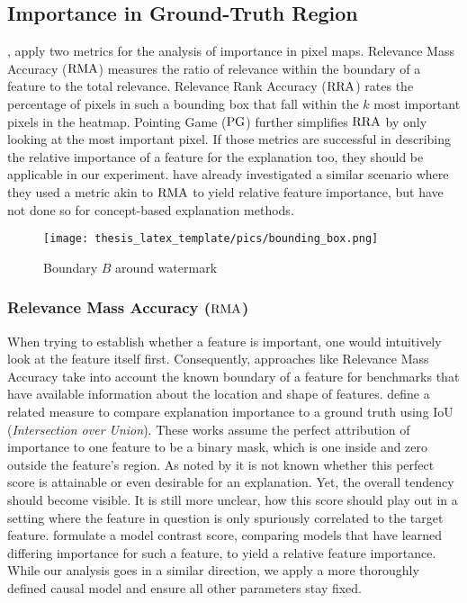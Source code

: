 \subsection{Importance in Ground-Truth Region}\label{section:region_specific}
\citet{Arras2022}, apply two metrics for the analysis of importance in pixel maps. Relevance Mass Accuracy ($\operatorname*{RMA}$) measures the ratio of relevance within the boundary of a feature to the total relevance. Relevance Rank Accuracy ($\operatorname*{RRA}$) rates the percentage of pixels in such a bounding box that fall within the $k$ most important pixels in the heatmap.  Pointing Game ($\operatorname*{PG}$) further simplifies $\operatorname*{RRA}$ by only looking at the most important pixel. If those metrics are successful in describing the relative importance of a feature for the explanation too, they should be applicable in our experiment. \cite{Yang2019} have already investigated a similar scenario where they used a metric akin to $\operatorname*{RMA}$ to yield relative feature importance, but have not done so for concept-based explanation methods.
\begin{figure}[t!]
    \centering
        \texttt{[image: thesis\_latex\_template/pics/bounding\_box.png]}
\caption{Boundary $B$ around watermark}
\label{fig:bounding_box}
\end{figure}

\subsubsection{Relevance Mass Accuracy ($\operatorname*{RMA}$)}
When trying to establish whether a feature is important, one would intuitively look at the feature itself first. Consequently, approaches like Relevance Mass Accuracy take into account the known boundary of a feature for benchmarks that have available information about the location and shape of features.
\citet{Bau2017} define a related measure to compare explanation importance to a ground truth using IoU (\textit{Intersection over Union}). These works assume the perfect attribution of importance to one feature to be a binary mask, which is one inside and zero outside the feature's region.
As noted by \citet{Arras2022} it is not known whether this perfect score is attainable or even desirable for an explanation. Yet, the overall tendency should become visible. It is still more unclear, how this score should play out in a setting where the feature in question is only spuriously correlated to the target feature. \citet{Yang2019} formulate a model contrast score, comparing models that have learned differing importance for such a feature, to yield a relative feature importance. While our analysis goes in a similar direction, we apply a more thoroughly defined causal model and ensure all other parameters stay fixed. 

